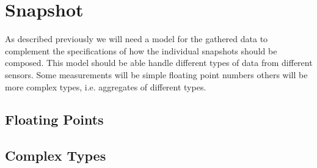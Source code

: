 
\section{Snapshot}
\label{sec:snapshot}

As described previously we will need a model for the gathered data to complement the specifications of how the individual snapshots should be composed. This model should be able handle different types of data from different sensors. Some measurements will be simple floating point numbers others will be more complex types, i.e. aggregates of different types. 

\subsection{Floating Points}
\label{sub:floating_points}


\subsection{Complex Types}
\label{sub:complex_types}
